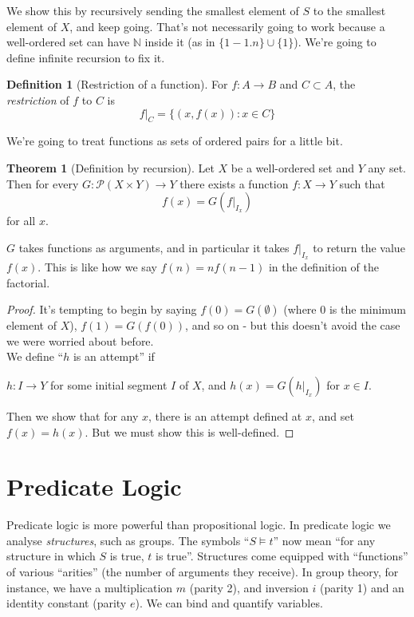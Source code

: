 \documentclass{article}
\theoremstyle{definition}
\newtheorem{definition}{Definition}
\newtheorem{theorem}{Theorem}
\numberwithin{definition}{section}
\newcommand{\entails}{\models}
\begin{document}
We show this by recursively sending the smallest element of $S$ to the smallest element of $X$, and keep going. That's not necessarily going to work because a well-ordered set can have $\mathbb{N}$ inside it (as in $\{1-1.n\} \cup \{1\}$). We're going to define infinite recursion to fix it. \\
\begin{definition}[Restriction of a function]
For $f: A \to B$ and $C \subset A$, the \textit{restriction} of $f$ to $C$ is 
$$f|_{C} = \{(x,f(x)) : x \in C\}$$
\end{definition}
We're going to treat functions as sets of ordered pairs for a little bit. 
\begin{theorem}[Definition by recursion]
Let $X$ be a well-ordered set and $Y$ any set. Then for every $G: \mathcal{P}(X \times Y) \to Y$ there exists a function $f:X \to Y$ such that 
$$f(x) = G(f|_{I_{x}})$$
for all $x$. 
\end{theorem} 
$G$ takes functions as arguments, and in particular it takes $f|_{I_{x}}$ to return the value $f(x)$. This is like how we say $f(n) = nf(n-1)$ in the definition of the factorial. 
\begin{proof}
It's tempting to begin by saying $f(0) = G(\emptyset)$ (where $0$ is the minimum element of $X$), $f(1) = G(f(0))$, and so on - but this doesn't avoid the case we were worried about before. \\
We define ``$h$ is an attempt'' if
\begin{center}
$h:I \to Y$ for some initial segment $I$ of $X$, and $h(x) = G(h|_{I_{x}})$ for $x \in I$. 
\end{center}
Then we show that for any $x$, there is an attempt defined at $x$, and set $f(x)= h(x)$. But we must show this is well-defined. 


\end{proof}





\section{Predicate Logic}
Predicate logic is more powerful than propositional logic. In predicate logic we analyse \textit{structures}, such as groups. The symbols ``$S \entails t$'' now mean ``for any structure in which $S$ is true, $t$ is true''. Structures come equipped with ``functions'' of various ``arities'' (the number of arguments they receive). In group theory, for instance, we have a multiplication $m$ (parity 2), and inversion $i$ (parity 1) and an identity constant (parity $e$). We can bind and quantify variables. 
\end{document}
